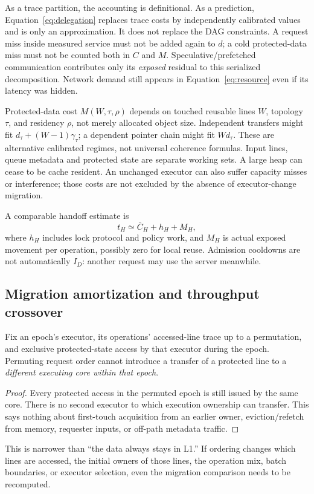 As a trace partition, the accounting is definitional. As a prediction,
Equation~\eqref{eq:delegation} replaces trace costs by independently calibrated
values and is only an approximation. It does not replace the DAG constraints.
A request miss inside measured service must not be added again to $d$;
a cold protected-data miss must not be counted both in $C$ and $M$.
Speculative/prefetched communication contributes only its \emph{exposed}
residual to this serialized decomposition. Network demand still appears in
Equation~\eqref{eq:resource} even if its latency was hidden.

Protected-data cost $M(W,\tau,\rho)$ depends on touched reusable lines $W$,
topology $\tau$, and residency $\rho$, not merely allocated object size.
Independent transfers might fit $d_\tau+(W-1)\gamma_\tau$; a dependent
pointer chain might fit $W d_\tau$. These are alternative calibrated regimes,
not universal coherence formulas. Input lines, queue metadata and protected
state are separate working sets. A large heap can cease to be cache resident.
An unchanged executor can also suffer capacity misses or interference;
those costs are not excluded by the absence of executor-change migration.

A comparable handoff estimate is
\begin{equation}
 t_H\simeq \bar C_H+h_H+M_H,\label{eq:handoff}
\end{equation}
where $h_H$ includes lock protocol and policy work, and $M_H$ is actual exposed
movement per operation, possibly zero for local reuse. Admission cooldowns
are not automatically $I_D$: another request may use the server meanwhile.

\subsection{Migration amortization and throughput crossover}
\label{sec:amortization}
\begin{proposition}
\label{prop:ownership}
Fix an epoch's executor, its operations' accessed-line trace up to a
permutation, and exclusive protected-state access by that executor during the
epoch. Permuting request order cannot introduce a transfer of a protected
line to a \emph{different executing core within that epoch}.
\end{proposition}
\begin{proof}
Every protected access in the permuted epoch is still issued by the same
core. There is no second executor to which execution ownership can transfer.
This says nothing about first-touch acquisition from an earlier owner,
eviction/refetch from memory, requester inputs, or off-path metadata traffic.
\end{proof}
This is narrower than ``the data always stays in L1.'' If ordering changes
which lines are accessed, the initial owners of those lines, the operation
mix, batch boundaries, or executor selection, even the migration comparison
needs to be recomputed.

